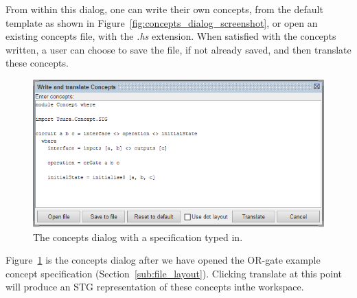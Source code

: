 \documentclass[british,conference,compsoc]{IEEEtran}
\begin{document}

From within this dialog, one can write their own concepts, from the default 
template as shown in Figure~\ref{fig:concepts_dialog_screenshot}, or open an 
existing concepts file, with the \emph{.hs} extension. When satisfied with the 
concepts written, a user can choose to save the file, if not already saved, and
then translate these concepts.

\begin{figure}[h]
\begin{centering}
\includegraphics[scale=0.45]{Images/concepts_dialog_or_gate.png}
\par\end{centering}

\begin{centering}
\protect\caption{\label{fig:concepts_dialog_or_gate}The concepts dialog with a 
			specification typed in.}

\par\end{centering}
\end{figure}

Figure~\ref{fig:concepts_dialog_or_gate} is the concepts dialog after we have 
opened the OR-gate example concept specification 
(Section~\ref{sub:file_layout}). Clicking translate at this point will produce 
an STG representation of these concepts inthe workspace. 
\end{document}
